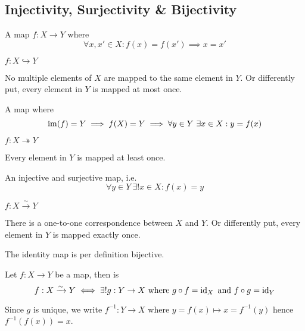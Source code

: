 \subsection{Injectivity, Surjectivity \& Bijectivity}
\begin{definition}\label{def:injective}
   A map \(f: X \to Y\) where
   \[\forall x, x' \in X: f(x) = f(x') \implies x = x'\]
\end{definition}
\begin{remark}[Notation]
   \(f: X \hookrightarrow Y\)
\end{remark}
\begin{remark}[Intuition]
   No multiple elements of \(X\) are mapped to the same element in \(Y\).
   Or differently put, every element in \(Y\) is mapped at most once.
\end{remark}

\begin{definition}\label{def:surjective}
   A map  where
   \[\operatorname{im}(f) = Y \implies f(X) = Y \implies \forall y \in Y~\exists x \in X: y = f(x)\]
\end{definition}
\begin{remark}[Notation]
   \(f: X \twoheadrightarrow Y\)
\end{remark}
\begin{remark}[Intuition]
   Every element in \(Y\) is mapped at least once.
\end{remark}

\begin{definition}\label{def:bijective}
   An injective and surjective map, i.e.
   \[\forall y \in Y~\exists! x \in X: f(x) = y\]
\end{definition}
\begin{remark}[Notation]
   \(f: X \xrightarrow{\sim} Y\)
\end{remark}
\begin{remark}[Intuition]
   There is a one-to-one correspondence between \(X\) and \(Y\).
   Or differently put, every element in \(Y\) is mapped exactly once.
\end{remark}
\begin{example}
   The identity map is per definition bijective.
\end{example}

\begin{proposition}
   Let \(f: X \to Y\) be a map, then is
   \[f: X \xrightarrow{\sim} Y \iff \exists! g: Y \to X~\text{where}~g \circ f = \operatorname{id}_X~\text{and}~f \circ g = \operatorname{id}_Y\]
\end{proposition}
\begin{remark}
   Since \(g\) is unique, we write \(f^{-1}: Y \to X\) where \(y = f(x) \mapsto x = f^{-1}(y)\) hence \(f^{-1}(f(x)) = x\).
\end{remark}

